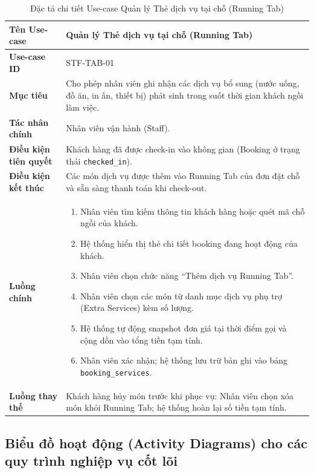 
\begin{table}[H]
\centering
\renewcommand{\arraystretch}{1.3}
\begin{tabular}{|p{4cm}|p{10cm}|}
\hline
\textbf{Tên Use-case} & Quản lý Thẻ dịch vụ tại chỗ (Running Tab) \\
\hline
\textbf{Use-case ID} & STF-TAB-01 \\
\hline
\textbf{Mục tiêu} & Cho phép nhân viên ghi nhận các dịch vụ bổ sung (nước uống, đồ ăn, in ấn, thiết bị) phát sinh trong suốt thời gian khách ngồi làm việc. \\
\hline
\textbf{Tác nhân chính} & Nhân viên vận hành (Staff). \\
\hline
\textbf{Điều kiện tiên quyết} & Khách hàng đã được check-in vào không gian (Booking ở trạng thái \texttt{checked\_in}). \\
\hline
\textbf{Điều kiện kết thúc} & Các món dịch vụ được thêm vào Running Tab của đơn đặt chỗ và sẵn sàng thanh toán khi check-out. \\
\hline
\textbf{Luồng chính} & 
\begin{enumerate}
    \item Nhân viên tìm kiếm thông tin khách hàng hoặc quét mã chỗ ngồi của khách.
    \item Hệ thống hiển thị thẻ chi tiết booking đang hoạt động của khách.
    \item Nhân viên chọn chức năng ``Thêm dịch vụ Running Tab''.
    \item Nhân viên chọn các món từ danh mục dịch vụ phụ trợ (Extra Services) kèm số lượng.
    \item Hệ thống tự động snapshot đơn giá tại thời điểm gọi và cộng dồn vào tổng tiền tạm tính.
    \item Nhân viên xác nhận; hệ thống lưu trữ bản ghi vào bảng \texttt{booking\_services}.
\end{enumerate} \\
\hline
\textbf{Luồng thay thế} & Khách hàng hủy món trước khi phục vụ: Nhân viên chọn xóa món khỏi Running Tab; hệ thống hoàn lại số tiền tạm tính. \\
\hline
\end{tabular}
\caption{Đặc tả chi tiết Use-case Quản lý Thẻ dịch vụ tại chỗ (Running Tab)}
\label{tab:uc-running-tab}
\end{table}

\subsection{Biểu đồ hoạt động (Activity Diagrams) cho các quy trình nghiệp vụ cốt lõi}

